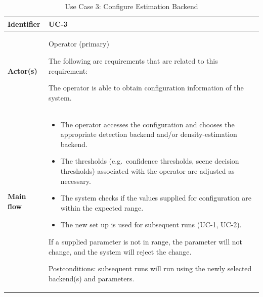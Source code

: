 

\begin{longtable}{|p{3.0cm}|p{12.5cm}|}

\caption{Use Case 3: Configure Estimation Backend}
\label{tab:uc3} \\

\hline

\textbf{Identifier} &
UC-3
\\
\hline

\textbf{Actor(s)} &
Operator (primary)

The following are requirements that are related to this requirement:

The operator is able to obtain configuration information of the system.
\\
\hline

\textbf{Main flow} &
\begin{itemize}[leftmargin=16pt, itemsep=0pt, topsep=0pt]
    \item The operator accesses the configuration and chooses the appropriate detection backend and/or density-estimation backend.
    
    \item The thresholds (e.g.\ confidence thresholds, scene decision thresholds) associated with the operator are adjusted as necessary.
    
    \item The system checks if the values supplied for configuration are within the expected range.
    
    \item The new set up is used for subsequent runs (UC-1, UC-2).
\end{itemize}

If a supplied parameter is not in range, the parameter will not change, and the system will reject the change.

Postconditions: subsequent runs will run using the newly selected backend(s) and parameters.
\\
\hline

\end{longtable}


